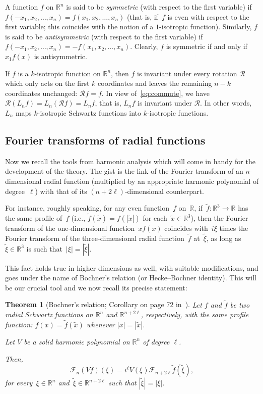 \documentclass[a4paper,12pt,reqno]{amsart}
\numberwithin{equation}{section}
\newtheorem{theorem}{Theorem}[section]
\theoremstyle{definition}
\theoremstyle{notation}
\newcommand{\fourier}{\mathscr{F}}
\newcommand{\R}{\mathds{R}}
\begin{document}
A function $f$ on $\R^n$ is said to be \emph{symmetric} (with respect to the first variable) if~$f(-x_1, x_2, \ldots, x_n) = f(x_1, x_2, \ldots, x_n)$ (that is, if~$f$ is even with respect to the first variable; this coincides with the notion of a $1$-isotropic function). Similarly, $f$ is said to be \emph{antisymmetric} (with respect to the first variable) if~$f(-x_1, x_2, \ldots, x_n) = -f(x_1, x_2, \ldots, x_n)$. Clearly, $f$ is symmetric if and only if $x_1 f(x)$ is antisymmetric.


If $f$ is a $k$-isotropic function on $\R^n$, then $f$ is invariant under every rotation $\mathcal R$ which only acts on the first $k$ coordinates and leaves the remaining $n - k$ coordinates unchanged: $\mathcal R f = f$. In view of~\eqref{eq:commute}, we have $\mathcal R(L_n f) = L_n(\mathcal R f) = L_n f$, that is, $L_n f$ is invariant under $\mathcal R$. In other words, $L_n$ maps $k$-isotropic Schwartz functions into $k$-isotropic functions.


\subsection{Fourier transforms of radial functions} Now
we recall the tools from harmonic analysis which will come in handy for the development of the theory.
The gist is the link of the Fourier transform of an $n$-dimensional radial function (multiplied by an appropriate
harmonic polynomial
of degree~$\ell$) with that
of its $(n+2\ell)$-dimensional counterpart.


For instance, roughly speaking, for any even function~$f$ on~$\R$, if~$\tilde f:\R^3\to\R$ has the same profile of~$f$ (i.e., $\tilde f(\tilde x)=f(|\tilde x|)$ for each~$\tilde x\in\R^3$), then
the Fourier transform of the one-dimensional function~$x f(x)$ coincides with~$i\xi$ times
the Fourier transform of the three-dimensional radial function~$\tilde f$ at~$\tilde\xi$, as long as~$\tilde\xi\in\R^3$
is such that~$|\xi|=|\tilde\xi|$.


This fact holds true in higher dimensions as well, with suitable modifications,
and goes under the name of Bochner's relation (or Hecke--Bochner identity). This will be our crucial tool and we now recall its precise statement:


\begin{theorem}[Bochner's relation; Corollary on page 72 in~\cite{stein}]
\label{thm:bochner}
Let $f$ and $\tilde{f}$ be two radial Schwartz functions on $\R^n$ and $\R^{n + 2 \ell}$, respectively, with the same profile function: $f(x) = \tilde{f}(\tilde{x})$ whenever $|x| = |\tilde x|$.


Let $V$ be a solid harmonic polynomial on $\R^n$ of degree $\ell$.


Then,
\[
 \fourier_n (V f)(\xi) = i^\ell V(\xi) \fourier_{n + 2 \ell} \tilde{f}(\tilde{\xi}) ,
\]
for every~$\xi\in\R^n$ and~$\tilde\xi\in\R^{n+2\ell}$ such that $|\tilde{\xi}| = |\xi|$.
\end{theorem}
\end{document}
